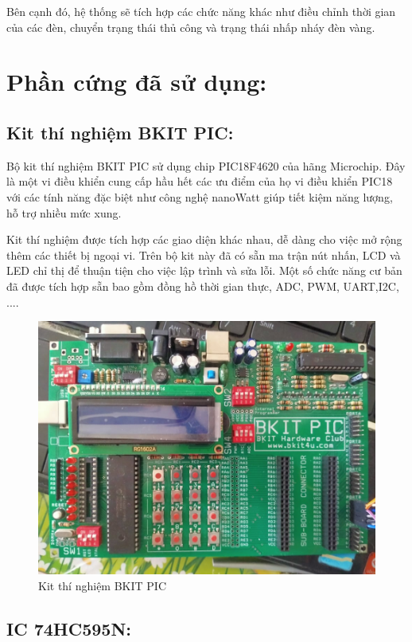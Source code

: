 \documentclass[a4paper]{article}
\begin{document}
Bên cạnh đó, hệ thống sẽ tích hợp các chức năng khác như điều chỉnh thời gian của các đèn, chuyển trạng thái thủ công và trạng thái nhấp nháy đèn vàng. 

\section{Phần cứng đã sử dụng:}
\subsection{Kit thí nghiệm BKIT PIC:}
Bộ kit thí nghiệm BKIT PIC sử dụng chip PIC18F4620 của hãng Microchip. Đây là một vi điều khiển cung cấp hầu hết các ưu điểm của họ vi điều khiển PIC18 với các tính năng đặc biệt như công nghệ nanoWatt giúp tiết kiệm năng lượng, hỗ trợ nhiều mức xung.

Kit thí nghiệm được tích hợp các giao diện khác nhau, dễ dàng cho việc mở rộng thêm các thiết bị ngoại vi. Trên bộ kit này đã có sẵn ma trận nút nhấn, LCD và LED chỉ thị để thuận tiện cho việc lập trình và sửa lỗi. Một số chức năng cư bản đã được tích hợp sẵn bao gồm đồng hồ thời gian thực, ADC, PWM, UART,I2C, ....
\begin{figure}[H]
\begin{center}
\includegraphics[width=12cm]{pic3.jpg}
\caption{Kit thí nghiệm BKIT PIC}
\end{center}
\end{figure}
\subsection{IC 74HC595N:}
\end{document}
